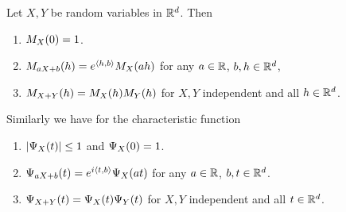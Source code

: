 
\begin{exercise}[subtitle={Properties of moment generating functions \Coffeecup}]
    \label{ex: properties moment generating functions}
    Let \(X, Y\) be random variables in \(\mathbb{R}^d\).
    Then
    \begin{enumerate}[label=(\alph*)]
        \item\label{it: (mgf) zero} \(M_X(0) = 1\).
        \item\label{it: (mgf) linear transformation} \(M_{aX + b}(h) = e^{\langle h,b\rangle} M_X(a h)\)
        for any \(a\in \mathbb{R}\), \(b, h\in \mathbb{R}^d\),
        \item\label{it: (mgf) idependent sum} \(M_{X+Y}(h) = M_X(h) M_Y(h)\) for \(X,Y\) independent and all \(h\in \mathbb{R}^d\).
    \end{enumerate}
    Similarly we have for the characteristic function
    \begin{enumerate}[label=(\alph*), resume]
        \item\label{it: (charfct) bounded} \(\lvert\Psi_X(t)\rvert\le 1\) and \(\Psi_X(0) = 1\).
        \item\label{it: (charfct) linear transformation} \(\Psi_{aX + b}(t) = e^{i\langle t,b\rangle} \Psi_X(a t)\)
        for any \(a\in \mathbb{R}\), \(b, t\in \mathbb{R}^d\).
        \item\label{it: (charfct) independent sum} \(\Psi_{X+Y}(t) = \Psi_X(t) \Psi_Y(t)\) for \(X,Y\) independent and all \(t\in \mathbb{R}^d\).
    \end{enumerate}
\end{exercise}

